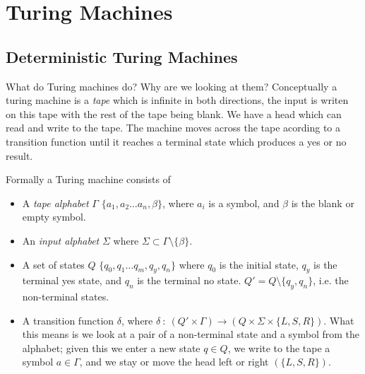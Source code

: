 \section{Turing Machines}
\subsection{Deterministic Turing Machines}
What do Turing machines do? Why are we looking at them?
Conceptually a turing machine is a \textit{tape} which is infinite in both directions,
the input is writen on this tape with the rest of the tape being blank. We have a head
which can read and write to the tape. The machine moves across the tape acording to
a transition function until it reaches a terminal state which produces a yes or no result.

\begin{center}
\end{center}

\begin{definition}
    Formally a Turing machine consists of
    \begin{itemize}
        \item A \textit{tape alphabet} $\Gamma$ $\{a_1, a_2 \dots a_n, \beta\}$,
            where $a_i$ is a symbol, and $\beta$ is the blank or empty symbol.
        \item An \textit{input alphabet} $\Sigma$
            where $\Sigma \subset \Gamma \setminus \{\beta\}$.
        \item A set of states $Q$ $\{q_0, q_1 \dots q_m, q_y, q_n\}$ where $q_0$ is the
            initial state, $q_y$ is the terminal yes state, and $q_n$ is the terminal no state.
            $Q\prime = Q \setminus \{q_y,q_n\}$, i.e. the non-terminal states.
        \item A transition function $\delta$,
            where $\delta\ :\ (Q\prime \times \Gamma) \rightarrow
            (Q \times \Sigma \times \{L,S,R\})$.
            What this means is we look at a pair of a non-terminal state
            and a symbol from the alphabet;
            given this we enter a new state $q \in Q$,
            we write to the tape a symbol $a \in \Gamma$,
            and we stay or move the head left or right $(\{L,S,R\})$.
    \end{itemize}
\end{definition}

